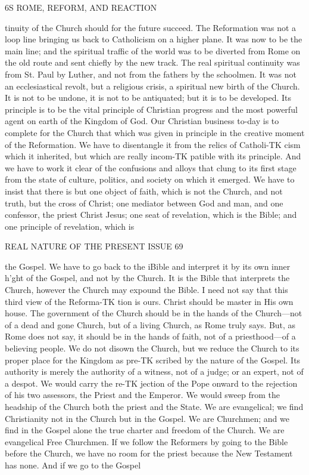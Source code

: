 \documentclass[12pt,a5paper,oneside]{book}
\begin{document}
6S ROME, REFORM, AND REACTION 

tinuity of the Church should for the future succeed. 
The Reformation was not a loop line bringing us back 
to Catholicism on a higher plane. It was now to 
be the main line; and the spiritual traffic of the 
world was to be diverted from Rome on the old route 
and sent chiefly by the new track. The real spiritual 
continuity was from St. Paul by Luther, and not 
from the fathers by the schoolmen. It was not an 
ecclesiastical revolt, but a religious crisis, a spiritual 
new birth of the Church. It is not to be undone, 
it is not to be antiquated; but it is to be developed. 
Its principle is to be the vital principle of Christian 
progress and the most powerful agent on earth of the 
Kingdom of God. Our Christian business to-day is 
to complete for the Church that which was given in 
principle in the creative moment of the Reformation. 
We have to disentangle it from the relics of Catholi-TK
cism which it inherited, but which are really incom-TK
patible with its principle. And we have to work it 
clear of the confusions and alloys that clung to its 
first stage from the state of culture, politics, and 
society on which it emerged. We have to insist that 
there is but one object of faith, which is not the 
Church, and not truth, but the cross of Christ; one 
mediator between God and man, and one confessor, 
the priest Christ Jesus; one seat of revelation, which 
is the Bible; and one principle of revelation, which is 



REAL NATURE OF THE PRESENT ISSUE 69 

the Gospel. We have to go back to the iBible and 
interpret it by its own inner h'ght of the Gospel, and 
not by the Church. It is the Bible that interprets the 
Church, however the Church may expound the Bible. 
I need not say that this third view of the Reforma-TK
tion is ours. Christ should be master in His own 
house. The government of the Church should be in 
the hands of the Church---not of a dead and gone 
Church, but of a living Church, as Rome truly says. 
But, as Rome does not say, it should be in the hands 
of faith, not of a priesthood---of a believing people. 
We do not disown the Church, but we reduce the 
Church to its proper place for the Kingdom as pre-TK
scribed by the nature of the Gospel. Its authority is 
merely the authority of a witness, not of a judge; or 
an expert, not of a despot. We would carry the re-TK
jection of the Pope onward to the rejection of his 
two assessors, the Priest and the Emperor. We 
would sweep from the headship of the Church both 
the priest and the State. We are evangelical; we 
find Christianity not in the Church but in the Gospel. 
We are Churchmen; and we find in the Gospel alone 
the true charter and freedom of the Church. We 
are evangelical Free Churchmen. If we follow the 
Reformers by going to the Bible before the Church, 
we have no room for the priest because the New 
Testament has none. And if we go to the Gospel 
\end{document}
